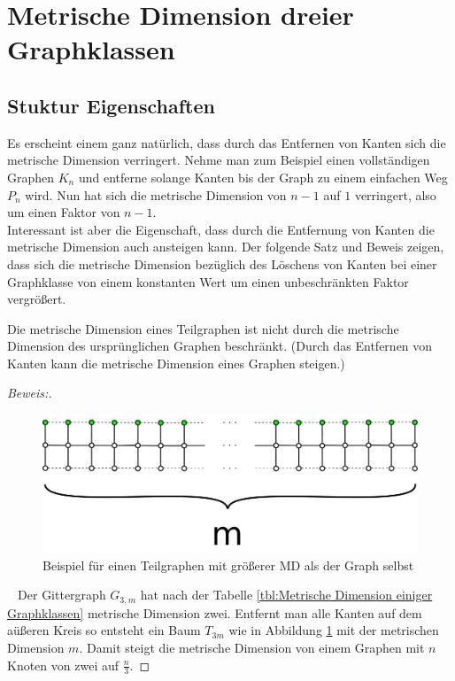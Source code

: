 \clearpage
\section{Metrische Dimension dreier Graphklassen}
\subsection{Stuktur Eigenschaften}
Es erscheint einem ganz natürlich, dass durch das Entfernen von Kanten sich die metrische Dimension verringert. Nehme man zum Beispiel einen vollständigen Graphen $K_n$ und entferne solange Kanten bis der Graph zu einem einfachen Weg $P_n$ wird. Nun hat sich die metrische Dimension von $n-1$ auf $1$ verringert, also um einen Faktor von $n-1$.\\Interessant ist aber die Eigenschaft, dass durch die Entfernung von Kanten die metrische Dimension auch ansteigen kann. Der folgende Satz und Beweis zeigen, dass sich die metrische Dimension bezüglich des Löschens von Kanten bei einer Graphklasse von einem konstanten Wert um einen unbeschränkten Faktor vergrößert.
\begin{lem}
Die metrische Dimension eines Teilgraphen ist nicht durch die metrische Dimension des ursprünglichen Graphen beschränkt. (Durch das Entfernen von Kanten kann die metrische Dimension eines Graphen steigen.)
\end{lem}
\begin{proof}[Beweis:]$\;$
\begin{figure}[h!]
		\centering 		 
\includegraphics[width=420pt]{bilder/gitterzubaum.pdf}
   \caption{Beispiel für einen Teilgraphen mit größerer MD als der Graph selbst}
   \label{bild:Gitterbaum1}
\end{figure}
\textcolor{white}{x}\newline
Der Gittergraph $G_{3,m}$ hat nach der Tabelle \ref{tbl:Metrische Dimension einiger Graphklassen} metrische Dimension zwei. Entfernt man alle Kanten auf dem aüßeren Kreis so entsteht ein Baum $T_{3m}$ wie in Abbildung \ref{bild:Gitterbaum1} mit der metrischen Dimension $m$. Damit steigt die metrische Dimension von einem Graphen mit $n$ Knoten von zwei auf $\frac{n}{3}$.
\end{proof}
